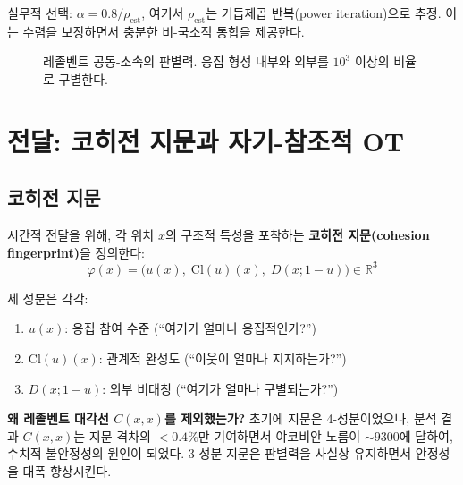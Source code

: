 실무적 선택: $\alpha = 0.8 / \rho_{\text{est}}$, 여기서 $\rho_{\text{est}}$는 거듭제곱 반복(power iteration)으로 추정. 이는 수렴을 보장하면서 충분한 비-국소적 통합을 제공한다.

\begin{figure}[t]
\centering
\caption{레졸벤트 공동-소속의 판별력. 응집 형성 내부와 외부를 $10^3$ 이상의 비율로 구별한다.}
\label{fig:resolvent-heatmap}
\end{figure}


\section{전달: 코히전 지문과 자기-참조적 OT}
\label{sec:transport-realization}

\subsection{코히전 지문}

시간적 전달을 위해, 각 위치 $x$의 구조적 특성을 포착하는 \textbf{코히전 지문(cohesion fingerprint)}을 정의한다:
\begin{equation}
    \varphi(x) = \big( u(x),\; \mathrm{Cl}(u)(x),\; D(x; 1-u) \big) \in \mathbb{R}^3
    \label{eq:fingerprint}
\end{equation}

세 성분은 각각:
\begin{enumerate}
    \item $u(x)$: 응집 참여 수준 (``여기가 얼마나 응집적인가?'')
    \item $\mathrm{Cl}(u)(x)$: 관계적 완성도 (``이웃이 얼마나 지지하는가?'')
    \item $D(x; 1-u)$: 외부 비대칭 (``여기가 얼마나 구별되는가?'')
\end{enumerate}

\textbf{왜 레졸벤트 대각선 $C(x,x)$를 제외했는가?} 초기에 지문은 4-성분이었으나, 분석 결과 $C(x,x)$는 지문 격차의 $<0.4\%$만 기여하면서 야코비안 노름이 $\sim 9300$에 달하여, 수치적 불안정성의 원인이 되었다. 3-성분 지문은 판별력을 사실상 유지하면서 안정성을 대폭 향상시킨다.

